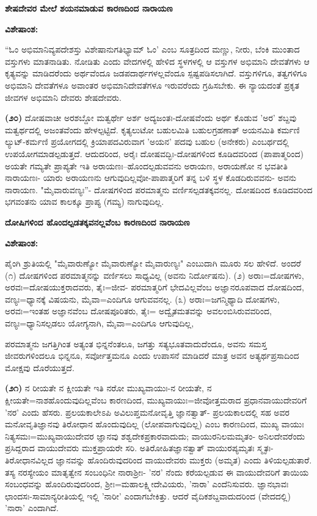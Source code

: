 \begin{center}
\textbf{ಶೇಷದೇವರ ಮೇಲೆ ಶಯನಮಾಡುವ ಕಾರಣದಿಂದ ನಾರಾಯಣ}
\end{center}

\noindent
\textbf{ವಿಶೇಷಾಂಶ:\enginline{-}}

“ಓಂ ಅಭಿಮಾನಿವ್ಯಪದೇಶಸ್ತು ವಿಶೇಷಾನುಗತಿಭ್ಯಾಮ್ ಓಂ' ಎಂಬ ಸೂತ್ರದಿಂದ ಮಣ್ಣು, ನೀರು, ಬೆಂಕಿ ಮುಂತಾದ ವಸ್ತುಗಳು ಮಾತನಾಡಿತು. ನೋಡಿತು ಎಂದು ವೇದಗಳಲ್ಲಿ ಹೇಳಿದ ಸ್ಥಳಗಳಲ್ಲಿ ಆ ವಸ್ತುಗಳ ಅಭಿಮಾನಿ ದೇವತೆಗಳು ಆ ಕೃತ್ಯವನ್ನು ಮಾಡಿದರೆಂದು ಅರ್ಥವೆಂದೂ ಜಡಪದಾರ್ಥಗಳಲ್ಲವೆಂದೂ ಸ್ಪಷ್ಟಪಡಿಸಲಾಗಿದೆ. ವಸ್ತುಗಳಿಗೂ, ತತ್ವಗಳಿಗೂ ಅಭಿಮಾನಿ ದೇವತೆಗಳೂ ಅವಾಂತರ ಅಭಿಮಾನಿದೇವತೆಗಳೂ ಇರುವರೆಂದು ಗ್ರಹಿಸಬೇಕು. ಈ ನ್ಯಾಯದಂತೆ ಪ್ರಕೃತ ಜೀವಗಳ ಅಭಿಮಾನಿ ದೇವರು ಶೇಷದೇವರು.

\textbf{(೨೦)} ದೋಷವಾಚೀ ಅರಶಬ್ದೋ ಮತ್ವರ್ಥೇ ಅರ್ಶ ಅದ್ಯಜಂತಃ-ದೋಷವೆಂದು ಅರ್ಥ ಕೊಡುವ 'ಅರ' ಶಬ್ದವು ಮತ್ವರ್ಥದಲ್ಲಿ ಅಜಂತವೆಂದು ಹೇಳಲ್ಪಟ್ಟಿದೆ. ಕೃತ್ಯಲುಟೋ ಬಹುಲಮಿತಿ ಬಹುಲಗ್ರಹಣಾತ್ ಅಯನಮಿತಿ ಕರ್ಮಣಿ ಲ್ಯುಟ್-ಕರ್ಮಣಿ ಪ್ರಯೋಗದಲ್ಲಿ ಕ್ರಿಯಾಪದವಿರುವಾಗ 'ಅಯನ' ಪದವು ಬಹುಲ (ಅನೇಕರು) ಎಂಬರ್ಥದಲ್ಲಿ ಉಪಯೋಗಮಾಡಲ್ಪಡುತ್ತದೆ. ಆದುದರಿಂದ, ಅರೈಃ ದೋಷವದ್ಭಿಃ-ದೋಷಗಳಿಂದ ಕೂಡಿ\-ದವರಿಂದ (ಪಾಪಾತ್ಮರಿಂದ) ಅಯತೇ ಗಮ್ಯತೇ ಪ್ರಾಪ್ಯತೇ ಇತಿ ಅರಾಯಣಃ--ಹೊಂದಲ್ಪಡುವವನು ಅರಾಯಣ, ಅರಾಯಣೋ ನ ಭವತೀತಿ ನಾರಾಯಣಃ- ಯಾರು ಅರಾಯಣನು ಆಗುವುದಿಲ್ಲವೋ-ಪಾಪಾತ್ಮರಿಗೆ ತನ್ನ ಬಳಿ ಸ್ಥಳ ಕೊಡದಿರುವವನು- ಅವನು ನಾರಾಯಣ. "ಮೈವಾರುವಣ್ಯಃ''- ದೋಷಗಳಿಂದ ಪರಮಾತ್ಮನು ವರ್ಣಿಸಲ್ಪಡತಕ್ಕವನಲ್ಲ. ದೋಷದಿಂದ ಕೂಡಿದವರಿಂದ ಭಗವಂತನು ಯಾವ ಕಾಲಕ್ಕೂ ಪ್ರಾಪ್ಯ (ಗಮ್ಯ) ನಾಗುವುದಿಲ್ಲ.

\begin{center}
\textbf{ದೋಷಿಗಳಿಂದ ಹೊಂದಲ್ಪಡತಕ್ಕವನಲ್ಲವೆಂಬ ಕಾರಣದಿಂದ ನಾರಾಯಣ}
\end{center}

\noindent
\textbf{ವಿಶೇಷಾಂಶ:\enginline{-}}

ಪೈಂಗಿ ಶ್ರುತಿಯಲ್ಲಿ "ಮೈವಾರುಣ್ಯೋ ಮೈವಾರುಣ್ಯೋ ಮೈವಾರುಣ್ಯಃ" ಎಂಬುದಾಗಿ ಮೂರು ಸಲ ಹೇಳಿದೆ. ಅಂದರೆ (೧) ದೋಷಗಳಿಂದ ಪರಮಾತ್ಮನನ್ನು ವರ್ಣಿಸಲು ಸಾಧ್ಯವಿಲ್ಲ (ಅವನು ನಿರ್ದೋಷನು). (೨) ಅರಾಃ=ದೋಷಗಳು, ಅರವಃ=ದೋಷಯುಕ್ತರಾದವರು, ತೈಃ=ಜೀವ- ಪರಮಾತ್ಮರಿಗೆ ಭೇದವಿಲ್ಲವೆಂಬ ಅಜ್ಞಾನರೂಪವಾದ ದೋಷದಿಂದ, ವಣ್ಯಃ=\-ಧ್ಯಾನಕ್ಕೆ ವಿಷಯನು, ಮೈವಾ=ಎಂದಿಗೂ ಆಗುವವನಲ್ಲ. (೩) ಅರಾಃ=ಜಗನ್ಮಿಥ್ಯಾದಿ ದೋಷಗಳು, ಅರವಃ=ಇಂತಹ ಅಜ್ಞಾನವೆಂಬ ದೋಷಪೂರಿತರು, ತೈಃ= ಅದ್ವೈತಮತವನ್ನು ಅವಲಂಬಿಸಿರುವವರಿಂದ, ವಣ್ಯಃ=ಧ್ಯಾನಿಸಲ್ಪಡಲು ಯೋಗ್ಯನಾಗಿ, ಮೈವಾ=ಎಂದಿಗೂ ಆಗುವುದಿಲ್ಲ,

ಪರಮಾತ್ಮನು ಜಗತ್ತಿಗಿಂತ ಅತ್ಯಂತ ಭಿನ್ನನೆಂತಲೂ, ಜಗತ್ತು ಸತ್ಯಭೂತವಾದುದೆಂದೂ, ಅವನು ಸಮಸ್ತ ಜೀವರುಗಳಿಂದಲೂ ಭಿನ್ನನೂ, ಸರ್ವೋತ್ತಮನೂ ಎಂದು ಉಪಾಸನೆ ಮಾಡಿದರೆ ಮಾತ್ರ ಅವನ ಅತ್ಯರ್ಥಪ್ರಸಾದಿಂದ ಮೋಕ್ಷವು ದೊರೆಯುತ್ತದೆ.

\textbf{(೨೧)} ನ ರೀಯತೇ ನ ಕ್ಷೀಯತೇ ಇತಿ ನರೋ ಮುಖ್ಯವಾಯುಃ-ನ ರೀಯತೇ, ನ ಕ್ಷೀಯತೇ=ನಾಶಹೊಂದುವುದಿಲ್ಲವೆಂಬ ಕಾರಣದಿಂದ, ಮುಖ್ಯವಾಯುಃ=ಜೀವೋತ್ತಮರಾದ ಪ್ರಧಾನವಾಯುದೇವರಿಗೆ 'ನರ' ಎಂದು ಹೆಸರು. ಪ್ರಲಯಕಾಲೇಽಪಿ ಅವಿಲುಪ್ತಮನೋವೃತ್ತಿ ಜ್ಞಾನತ್ವಾತ್- ಪ್ರಲಯಕಾಲದಲ್ಲಿ ಸಹ ಅವರ ಮನೋವೃತಿಜ್ಞಾನವು ತಿರೋಧಾನ ಹೊಂದುವುದಿಲ್ಲ (ಲೋಪವಾಗುವುದಿಲ್ಲ) ಎಂಬ ಕಾರಣದಿಂದ, ಮುಖ್ಯ ವಾಯುಃ ನಿತ್ಯಸಮಃ=ಮುಖ್ಯ\-ವಾಯುದೇವರ ಜ್ಞಾನವು ಶಶ್ವದೇಕಪ್ರಕಾರವಾದುದು; ವಾಯುರನಿಲಮಮೃತಂ- ಅನಿಲದೇವರೆಂದು ಪ್ರಸಿದ್ದರಾದ ವಾಯುದೇವರು ಮುಕ್ತಪ್ರಾಯರೇ ಸರಿ. ಅತಿರೋಹಿತಜ್ಞಾನತ್ವಾತ್ ವಾಯುರಪ್ಯಮೃತಃ ಸ್ಮೃತಃ- ತಿರೋಧಾನವಿಲ್ಲದ ಜ್ಞಾನವನ್ನು ಹೊಂದಿರುವುದರಿಂದ ವಾಯುದೇವರು ಮುಕ್ತರು (ಅಮೃತ) ಎಂದು ತಿಳಿಯಲ್ಪಡುತಾರೆ. ತಸ್ಯ ನರಸ್ಯೇಯಂ ಮಾತೃತ್ವೇನ ಸಂಬಂಧಿನೀ ನಾರಾಶ‍್ರೀಃ- 'ನರ' ನೆಂದು ಕರೆಯಲ್ಪಡುವ ಈ ವಾಯುದೇವರಿಗೆ ತಾಯಿಯ ಸಂಬಂಧವನ್ನು ಹೊಂದಿರುವುದರಿಂದ, ಶ‍್ರೀಃ=ಮಹಾಲಕ್ಷ್ಮೀದೇವಿಯರು, 'ನಾರಾ' ಎಂದೆನಿಸುವರು. ಜ್ಞಾನಭಾವಃ ಛಾಂದಸಃ-ಸಾಮಾನ್ಯರೀತಿಯಲ್ಲಿ ಇಲ್ಲಿ 'ನಾರೀ' ಎಂದಾಗಬೇಕಿತ್ತು. ಆದರೆ ವೈದಿಕಶಬ್ದವಾದುದರಿಂದ (ವೇದದಲ್ಲಿ) 'ನಾರಾ' ಎಂದಾಗಿದೆ.

